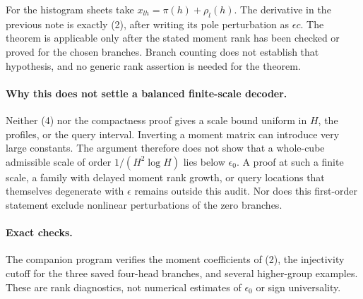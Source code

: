 \documentclass[11pt]{article}
\begin{document}
For the histogram sheets take
$x_{lh}=\pi(h)+\rho_l(h)$. The derivative in the previous note is
exactly (2), after writing its pole perturbation as $\epsilon c$.
The theorem is applicable only after the stated moment rank has been
checked or proved for the chosen branches. Branch counting does not
establish that hypothesis, and no generic rank assertion is needed
for the theorem.

\paragraph{Why this does not settle a balanced finite-scale decoder.}
Neither (4) nor the compactness proof gives a scale bound uniform in
$H$, the profiles, or the query interval. Inverting a moment matrix
can introduce very large constants. The argument therefore does not
show that a whole-cube admissible scale of order
$1/(H^2\log H)$ lies below $\epsilon_0$. A proof at such a finite
scale, a family with delayed moment rank growth, or query locations
that themselves degenerate with $\epsilon$ remains outside this
audit. Nor does this first-order statement exclude nonlinear
perturbations of the zero branches.

\paragraph{Exact checks.}
The companion program verifies the moment coefficients of (2),
the injectivity cutoff for the three saved four-head branches,
and several higher-group examples. These are rank diagnostics,
not numerical estimates of $\epsilon_0$ or sign universality.
\end{document}
